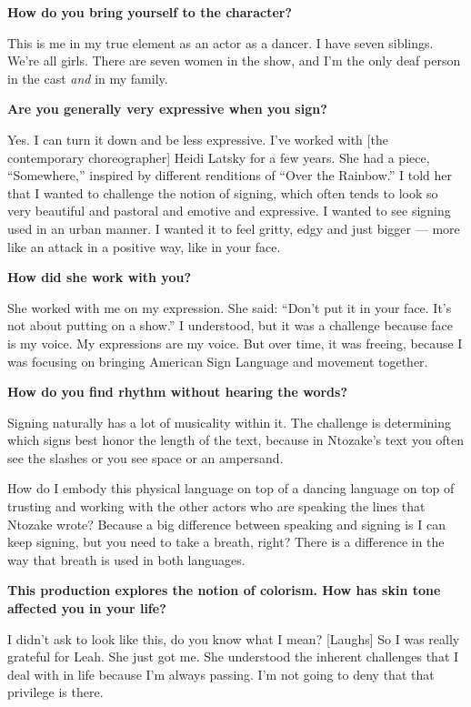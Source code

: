 \textbf{How do you bring yourself to the character?}

This is me in my true element as an actor as a dancer. I have seven
siblings. We're all girls. There are seven women in the show, and I'm
the only deaf person in the cast \emph{and} in my family.

\textbf{Are you generally very expressive when you sign?}

Yes. I can turn it down and be less expressive. I've worked with {[}the
contemporary choreographer{]} Heidi Latsky for a few years. She had a
piece, ``Somewhere,'' inspired by different renditions of ``Over the
Rainbow.'' I told her that I wanted to challenge the notion of signing,
which often tends to look so very beautiful and pastoral and emotive and
expressive. I wanted to see signing used in an urban manner. I wanted it
to feel gritty, edgy and just bigger --- more like an attack in a
positive way, like in your face.

\textbf{How did she work with you?}

She worked with me on my expression. She said: ``Don't put it in your
face. It's not about putting on a show.'' I understood, but it was a
challenge because face is my voice. My expressions are my voice. But
over time, it was freeing, because I was focusing on bringing American
Sign Language and movement together.

\textbf{How do you find rhythm without hearing the words?}

Signing naturally has a lot of musicality within it. The challenge is
determining which signs best honor the length of the text, because in
Ntozake's text you often see the slashes or you see space or an
ampersand.

How do I embody this physical language on top of a dancing language on
top of trusting and working with the other actors who are speaking the
lines that Ntozake wrote? Because a big difference between speaking and
signing is I can keep signing, but you need to take a breath, right?
There is a difference in the way that breath is used in both languages.

\textbf{This production explores the notion of colorism. How has skin
tone affected you in your life?}

I didn't ask to look like this, do you know what I mean? {[}Laughs{]} So
I was really grateful for Leah. She just got me. She understood the
inherent challenges that I deal with in life because I'm always passing.
I'm not going to deny that that privilege is there.

